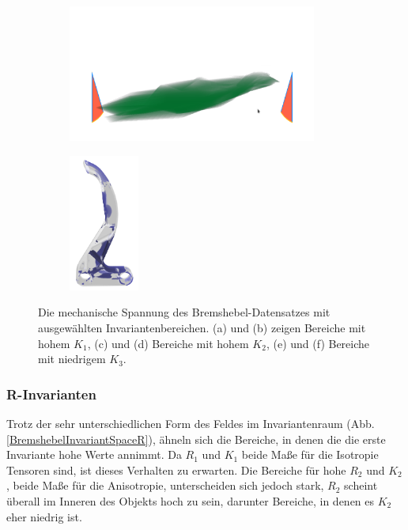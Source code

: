 \documentclass[a4paper,fontsize=12pt,toc=bib,halfparskip]{scrartcl}
\begin{document}
\begin{figure}
\begin{subfigure}{0.49\textwidth}
		\subcaption{}
		\label{BremshebelKObject2}
	\end{subfigure}
	\medskip
	\begin{subfigure}{0.49\textwidth}
		\centering
		\includegraphics[height=4.5cm]{pictures/results/Bremshebel_K_InvariantSpace3.png}
		\subcaption{}
		\label{BremshebelKInvariant3}
	\end{subfigure}
	\hspace*{\fill}
	\begin{subfigure}{0.49\textwidth}
		\centering
		\includegraphics[height=4.5cm]{pictures/results/Bremshebel_K_Object3.png}
		\subcaption{}
		\label{BremshebelKObject3}
	\end{subfigure}
	\caption{Die mechanische Spannung des Bremshebel-Datensatzes mit ausgew\"ahlten Invariantenbereichen. (a) und (b) zeigen Bereiche mit hohem $K_1$, (c) und (d) Bereiche mit hohem $K_2$, (e) und (f) Bereiche mit niedrigem $K_3$.}
	\label{BremshebelKInteraction}
\end{figure}

\subsubsection{R-Invarianten}
Trotz der sehr unterschiedlichen Form des Feldes im Invariantenraum (Abb. \ref{BremshebelInvariantSpaceR}), \"ahneln sich die Bereiche, in denen die die erste Invariante hohe Werte annimmt. Da $R_1$ und $K_1$ beide Ma{\ss}e f\"ur die Isotropie Tensoren sind, ist dieses Verhalten zu erwarten. Die Bereiche f\"ur hohe $R_2$ und $K_2$, beide Ma{\ss}e f\"ur die Anisotropie, unterscheiden sich jedoch stark, $R_2$ scheint \"uberall im Inneren des Objekts hoch zu sein, darunter Bereiche, in denen es $K_2$ eher niedrig ist. 
\end{document}
